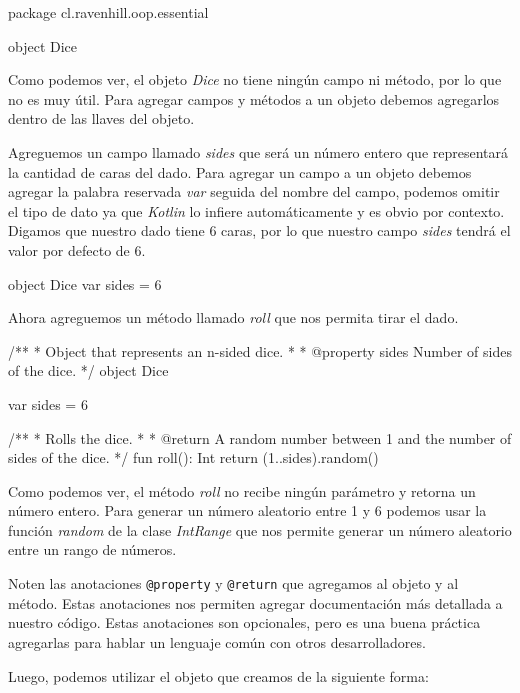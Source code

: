   \begin{kotlin}
    package cl.ravenhill.oop.essential

    object Dice {
    }
  \end{kotlin}

  Como podemos ver, el objeto \textit{Dice} no tiene ningún campo ni método, por lo que no es muy
  útil.
  Para agregar campos y métodos a un objeto debemos agregarlos dentro de las llaves del objeto.

  Agreguemos un campo llamado \textit{sides} que será un número entero que representará la cantidad
  de caras del dado.
  Para agregar un campo a un objeto debemos agregar la palabra reservada \textit{var} seguida del
  nombre del campo, podemos omitir el tipo de dato ya que \textit{Kotlin} lo infiere 
  automáticamente y es obvio por contexto.
  Digamos que nuestro dado tiene 6 caras, por lo que nuestro campo \textit{sides} tendrá el valor
  por defecto de 6.

  \begin{kotlin}
    object Dice {
      var sides = 6
    }
  \end{kotlin}

  Ahora agreguemos un método llamado \textit{roll} que nos permita tirar el dado.

  \begin{kotlin}
    /**
     * Object that represents an n-sided dice.
     * 
     * @property sides Number of sides of the dice.
     */
    object Dice {
      var sides = 6

      /**
       * Rolls the dice.
       * 
       * @return A random number between 1 and the number of sides of the dice.
       */
      fun roll(): Int {
        return (1..sides).random()
      }
    }
  \end{kotlin}

  Como podemos ver, el método \textit{roll} no recibe ningún parámetro y retorna un número entero.
  Para generar un número aleatorio entre 1 y 6 podemos usar la función \textit{random} de la clase
  \textit{IntRange} que nos permite generar un número aleatorio entre un rango de números.

  Noten las anotaciones \texttt{@property} y \texttt{@return} que agregamos al objeto y al método.
  Estas anotaciones nos permiten agregar documentación más detallada a nuestro código.
  Estas anotaciones son opcionales, pero es una buena práctica agregarlas para hablar un lenguaje
  común con otros desarrolladores.
  
  Luego, podemos utilizar el objeto que creamos de la siguiente forma:

